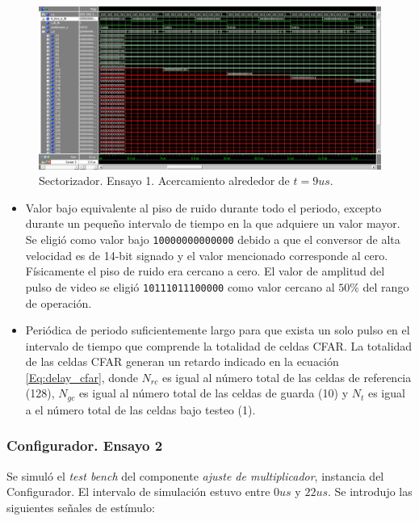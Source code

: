 \begin{figure}
\centering
\includegraphics[scale=0.5, angle=270]{./Figures/sectorizador_ensayo_1_zoom_mult.png}
\caption{Sectorizador. Ensayo 1. Acercamiento alrededor de $t = 9us$.}
\label{fig:sectorizador_ensayo_1_zoom_mult}
\end{figure}


\begin{itemize}
\item
Valor bajo equivalente al piso de ruido durante todo el periodo, excepto durante un pequeño intervalo de tiempo en la que adquiere un valor mayor. Se eligió como valor bajo \texttt{10000000000000} debido a que el conversor de alta velocidad es de 14-bit signado y el valor mencionado corresponde al cero. Físicamente el piso de ruido era cercano a cero. El valor de amplitud del pulso de video se eligió \texttt{10111011100000} como valor cercano al $50\%$ del rango de operación.


\item
Periódica de periodo suficientemente largo para que exista un solo pulso en el intervalo de tiempo que comprende la totalidad de celdas CFAR. La totalidad de las celdas CFAR generan un retardo indicado en la ecuación \ref{Eq:delay_cfar}, donde $N_{rc}$ es igual al número total de las celdas de referencia (128), $N_{gc}$ es igual al número total de las celdas de guarda (10) y $N_t$ es igual a el número total de las celdas bajo testeo (1).

\end{itemize}






\subsubsection{Configurador. Ensayo 2}
\label{Subsec:Configurador. Ensayo 2}
Se simuló el \textit{test bench} del componente \textit{ajuste de multiplicador}, instancia del Configurador. El intervalo de simulación estuvo entre $0 us$ y $22 us$. Se introdujo las siguientes señales de estímulo:

